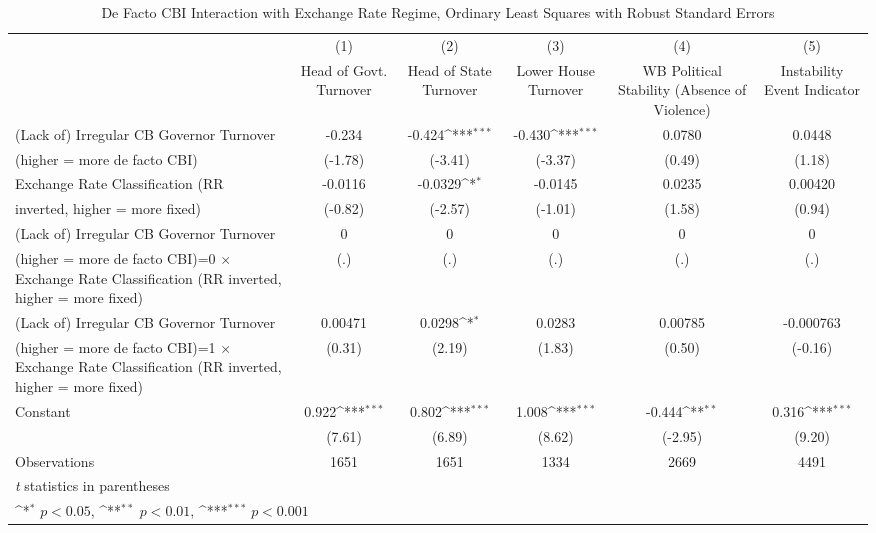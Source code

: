 \begin{table}[htbp]\centering
\def\sym#1{\ifmmode^{#1}\else\(^{#1}\)\fi}
\caption{De Facto CBI Interaction with Exchange Rate Regime, Ordinary Least Squares with Robust Standard Errors \label{imultIndOLSDF}}
\begin{tabular}{l*{5}{c}}
\toprule
                                        &\multicolumn{1}{c}{(1)}&\multicolumn{1}{c}{(2)}&\multicolumn{1}{c}{(3)}&\multicolumn{1}{c}{(4)}&\multicolumn{1}{c}{(5)}\\
                                        &\multicolumn{1}{c}{Head of Govt. Turnover}&\multicolumn{1}{c}{Head of State Turnover}&\multicolumn{1}{c}{Lower House Turnover}&\multicolumn{1}{c}{WB Political Stability (Absence of Violence)}&\multicolumn{1}{c}{Instability Event Indicator}\\
\midrule
(Lack of) Irregular CB Governor Turnover&   -0.234         &   -0.424\sym{***}&   -0.430\sym{***}&   0.0780         &   0.0448         \\
(higher = more de facto CBI)            &  (-1.78)         &  (-3.41)         &  (-3.37)         &   (0.49)         &   (1.18)         \\
\addlinespace
Exchange Rate Classification (RR        &  -0.0116         &  -0.0329\sym{*}  &  -0.0145         &   0.0235         &  0.00420         \\
inverted, higher = more fixed)          &  (-0.82)         &  (-2.57)         &  (-1.01)         &   (1.58)         &   (0.94)         \\
\addlinespace
(Lack of) Irregular CB Governor Turnover&        0         &        0         &        0         &        0         &        0         \\
(higher = more de facto CBI)=0 $\times$ Exchange Rate Classification (RR inverted, higher = more fixed)&      (.)         &      (.)         &      (.)         &      (.)         &      (.)         \\
\addlinespace
(Lack of) Irregular CB Governor Turnover&  0.00471         &   0.0298\sym{*}  &   0.0283         &  0.00785         &-0.000763         \\
(higher = more de facto CBI)=1 $\times$ Exchange Rate Classification (RR inverted, higher = more fixed)&   (0.31)         &   (2.19)         &   (1.83)         &   (0.50)         &  (-0.16)         \\
\addlinespace
Constant                                &    0.922\sym{***}&    0.802\sym{***}&    1.008\sym{***}&   -0.444\sym{**} &    0.316\sym{***}\\
                                        &   (7.61)         &   (6.89)         &   (8.62)         &  (-2.95)         &   (9.20)         \\
\midrule
Observations                            &     1651         &     1651         &     1334         &     2669         &     4491         \\
\bottomrule
\multicolumn{6}{l}{\footnotesize \textit{t} statistics in parentheses}\\
\multicolumn{6}{l}{\footnotesize \sym{*} \(p<0.05\), \sym{**} \(p<0.01\), \sym{***} \(p<0.001\)}\\
\end{tabular}
\end{table}

